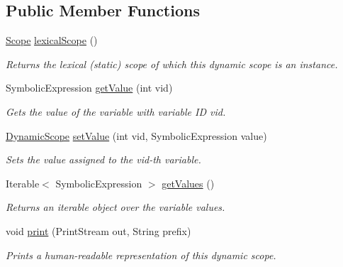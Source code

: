\subsection*{Public Member Functions}
\begin{DoxyCompactItemize}
\item 
\hyperlink{interfaceedu_1_1udel_1_1cis_1_1vsl_1_1civl_1_1model_1_1IF_1_1Scope}{Scope} \hyperlink{interfaceedu_1_1udel_1_1cis_1_1vsl_1_1civl_1_1state_1_1IF_1_1DynamicScope_ae77437896fba8841eea79950d9ffa1d5}{lexical\+Scope} ()
\begin{DoxyCompactList}\small\item\em Returns the lexical (static) scope of which this dynamic scope is an instance. \end{DoxyCompactList}\item 
Symbolic\+Expression \hyperlink{interfaceedu_1_1udel_1_1cis_1_1vsl_1_1civl_1_1state_1_1IF_1_1DynamicScope_a971e60823b02eb908abac38b6dcfe3a6}{get\+Value} (int vid)
\begin{DoxyCompactList}\small\item\em Gets the value of the variable with variable I\+D vid. \end{DoxyCompactList}\item 
\hyperlink{interfaceedu_1_1udel_1_1cis_1_1vsl_1_1civl_1_1state_1_1IF_1_1DynamicScope}{Dynamic\+Scope} \hyperlink{interfaceedu_1_1udel_1_1cis_1_1vsl_1_1civl_1_1state_1_1IF_1_1DynamicScope_a4ec67e84183f3744e68193ac348d8be5}{set\+Value} (int vid, Symbolic\+Expression value)
\begin{DoxyCompactList}\small\item\em Sets the value assigned to the vid-\/th variable. \end{DoxyCompactList}\item 
Iterable$<$ Symbolic\+Expression $>$ \hyperlink{interfaceedu_1_1udel_1_1cis_1_1vsl_1_1civl_1_1state_1_1IF_1_1DynamicScope_a8be3c9e37cdb47cbcd79b7760bc7ad0b}{get\+Values} ()
\begin{DoxyCompactList}\small\item\em Returns an iterable object over the variable values. \end{DoxyCompactList}\item 
void \hyperlink{interfaceedu_1_1udel_1_1cis_1_1vsl_1_1civl_1_1state_1_1IF_1_1DynamicScope_a93555f6df5d24b516924885524ea60eb}{print} (Print\+Stream out, String prefix)
\begin{DoxyCompactList}\small\item\em Prints a human-\/readable representation of this dynamic scope. \end{DoxyCompactList}\item 

\end{DoxyCompactItemize}
